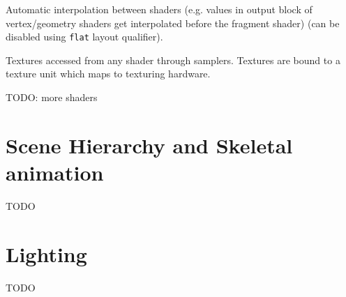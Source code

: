 \documentclass[a4paper]{article}
\begin{document}
Automatic interpolation between shaders (e.g. values in output block of
vertex/geometry shaders get interpolated before the fragment shader) (can be
disabled using \texttt{flat} layout qualifier).

Textures accessed from any shader through samplers. Textures are bound to a
texture unit which maps to texturing hardware.

TODO: more shaders

\section{Scene Hierarchy and Skeletal animation}

TODO

\section{Lighting}

TODO
\end{document}
